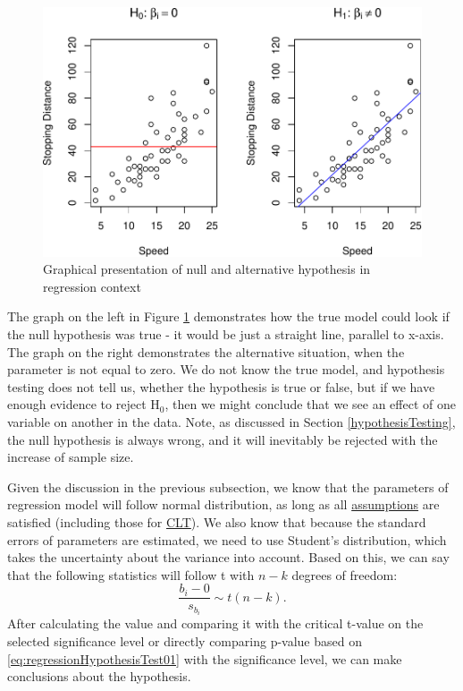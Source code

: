 \documentclass[
]{book}
\theoremstyle{definition}
\theoremstyle{definition}
\theoremstyle{definition}
\theoremstyle{definition}
\theoremstyle{remark}
\begin{document}
\begin{figure}
\centering
\includegraphics{Svetunkov---Statistics-for-Business-Analytics_files/figure-latex/speedDistanceHypotheses-1.pdf}
\caption{\label{fig:speedDistanceHypotheses}Graphical presentation of null and alternative hypothesis in regression context}
\end{figure}

The graph on the left in Figure \ref{fig:speedDistanceHypotheses} demonstrates how the true model could look if the null hypothesis was true - it would be just a straight line, parallel to x-axis. The graph on the right demonstrates the alternative situation, when the parameter is not equal to zero. We do not know the true model, and hypothesis testing does not tell us, whether the hypothesis is true or false, but if we have enough evidence to reject H\(_0\), then we might conclude that we see an effect of one variable on another in the data. Note, as discussed in Section \ref{hypothesisTesting}, the null hypothesis is always wrong, and it will inevitably be rejected with the increase of sample size.

Given the discussion in the previous subsection, we know that the parameters of regression model will follow normal distribution, as long as all \hyperref[assumptions]{assumptions} are satisfied (including those for \hyperref[CLT]{CLT}). We also know that because the standard errors of parameters are estimated, we need to use Student's distribution, which takes the uncertainty about the variance into account. Based on this, we can say that the following statistics will follow t with \(n-k\) degrees of freedom:
\begin{equation}
    \frac{b_i - 0}{s_{b_i}} \sim t(n-k) .
    \label{eq:regressionHypothesisTest01}
\end{equation}
After calculating the value and comparing it with the critical t-value on the selected significance level or directly comparing p-value based on \eqref{eq:regressionHypothesisTest01} with the significance level, we can make conclusions about the hypothesis.
\end{document}
